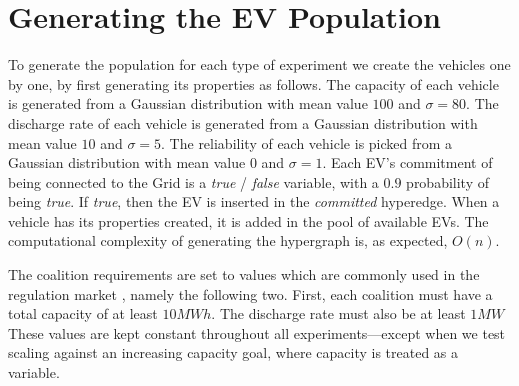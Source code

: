 \section{Generating the EV Population}\label{sec:generating}
To generate the population for each type of experiment we create the vehicles one by one, by first generating its properties as follows. The capacity of each vehicle is generated from a Gaussian distribution with mean value $100$ and $\sigma = 80$. The discharge rate of each vehicle is generated from a Gaussian distribution with mean value $10$ and $\sigma=5$. The reliability of each vehicle is picked from a Gaussian distribution with mean value $0$ and $\sigma=1$. Each EV's commitment of being connected to the Grid is a {\em true} / {\em false} variable, with a $0.9$ probability of being {\em true}. If {\em true}, then the EV is inserted in the {\em committed} hyperedge. When a vehicle has its properties created, it is added in the pool of available EVs. The computational complexity of generating the hypergraph is, as expected, $O(n)$.

The coalition requirements are set to values which are commonly used in the regulation market \cite{kamboj2011deploying}, namely the following two. First, each coalition must have a total capacity of at least $10MWh$. The discharge rate must also be at least $1MW$ \cite{kamboj2011deploying}
These values are kept constant throughout all experiments---except when we test scaling against an increasing capacity goal, where capacity is treated as a variable.


